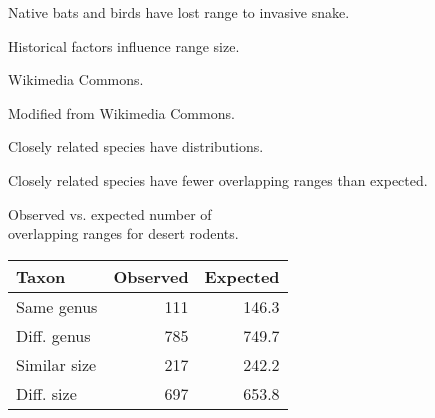 \documentclass[t,handout]{beamer}  %
\begin{document}
%
{
\begin{frame}[b]{Native bats and birds have lost range to invasive snake.}
\end{frame}
}
%
{
\begin{frame}[b]{Historical factors influence range size.}
\end{frame}
}
%
{
\begin{frame}[b]
\tiny Wikimedia Commons.
\end{frame}
}
%

{
\begin{frame}[b]
	\tiny Modified from Wikimedia Commons.
\end{frame}
}
%
{
\begin{frame}[t]{Closely related species have  distributions.}
\end{frame}
}
%
\begin{frame}[t]{Closely related species have fewer overlapping ranges than expected.}

	\begin{center}
		\hangpara Observed vs. expected number of \\\hspace{0.5em} overlapping ranges for desert rodents.

		\begin{tabular}{@{}lrr@{}}
		\toprule
		Taxon & Observed & Expected \tabularnewline
		\midrule
		Same genus & 111 & 146.3 \tabularnewline
		Diff. genus & 785 & 749.7 \tabularnewline
		Similar size & 217 & 242.2 \tabularnewline
		Diff. size & 697 & 653.8 \tabularnewline
		\bottomrule
		\end{tabular}
	\end{center}
\end{frame}
%
{
\begin{frame}[b]
\end{frame}
}
%
%
\end{document}
